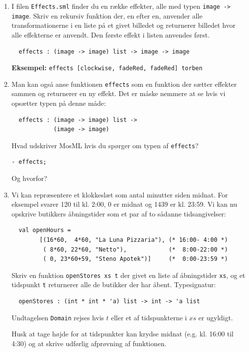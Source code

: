 \documentclass[a4paper,12pt]{article}
\begin{document}
\begin{enumerate}[{3I}1]
\item I filen \verb|Effects.sml| finder du en række effekter, alle med
  typen \verb|image -> image|. Skriv en rekursiv funktion der, en
  efter en, anvender alle transformationerne i en liste på et givet
  billedet og returnerer billedet hvor alle effekterne er anvendt. Den
  første effekt i listen anvendes først.

\begin{lstlisting}
  effects : (image -> image) list -> image -> image
\end{lstlisting}

\textbf{Eksempel:} \verb|effects [clockwise, fadeRed, fadeRed] torben|

\item Man kan også anse funktionen \texttt{effects} som en funktion
  der sætter effekter sammen og returnerer en ny effekt. Det er måske
  nemmere at se hvis vi opsætter typen på denne måde:
\begin{lstlisting}
  effects : (image -> image) list ->
            (image -> image)
\end{lstlisting}
Hvad udskriver MosML hvis du spørger om typen af \texttt{effects}?
\begin{lstlisting}
- effects;
\end{lstlisting}
Og hvorfor?

\item Vi kan repræsentere et klokkeslæt som antal minutter siden
  midnat. For eksempel svarer 120 til kl. 2:00, 0 er midnat og 1439 er
  kl. 23:59. Vi kan nu opskrive butikkers åbningstider som et par af
  to sådanne tidsangivelser:

  \begin{lstlisting}
  val openHours =
        [(16*60,  4*60, "La Luna Pizzaria"), (* 16:00- 4:00 *)
         ( 8*60, 22*60, "Netto"),            (*  8:00-22:00 *)
         ( 0, 23*60+59, "Steno Apotek")]     (*  0:00-23:59 *)
  \end{lstlisting}

  Skriv en funktion \verb|openStores xs t| der givet en liste af
  åbningstider \verb|xs|, og et tidspunkt \verb|t| returnerer alle de
  butikker der har åbent. Typesignatur:
  \begin{lstlisting}
  openStores : (int * int * 'a) list -> int -> 'a list
  \end{lstlisting}
  Undtagelsen \lstinline{Domain} rejses hvis $t$ eller et af
  tidspunkterne i $xs$ er ugyldigt.

  Husk at tage højde for at tidspunkter kan krydse midnat
  (e.g. kl. 16:00 til 4:30) og at skrive udførlig afprøvning af
  funktionen.
\end{enumerate}
\end{document}
